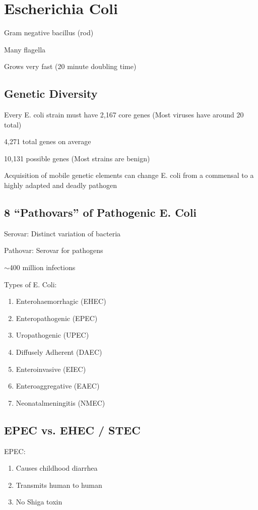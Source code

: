 \documentclass{notes}
\begin{document}
\section*{Escherichia Coli}
Gram negative bacillus (rod)

Many flagella

Grows very fast (20 minute doubling time)

\subsection*{Genetic Diversity}
Every E. coli strain must have 2,167 core genes (Most viruses have around 20 total)

4,271 total genes on average

10,131 possible genes (Most strains are benign)

Acquisition of mobile genetic elements can change E. coli from a commensal to a highly adapted and deadly pathogen

\subsection*{8 ``Pathovars'' of Pathogenic E. Coli}
Serovar: Distinct variation of bacteria

Pathovar: Serovar for pathogens

\(\sim\)400 million infections

Types of E. Coli:
\begin{enumerate}
    \item Enterohaemorrhagic (EHEC)
    \item Enteropathogenic (EPEC)
    \item Uropathogenic (UPEC)
    \item Diffusely Adherent (DAEC)
    \item Enteroinvasive (EIEC)
    \item Enteroaggregative (EAEC)
    \item Neonatalmeningitis (NMEC)
\end{enumerate}

\subsection*{EPEC vs. EHEC / STEC}
EPEC:
\begin{enumerate}
    \item Causes childhood diarrhea
    \item Transmits human to human
    \item No Shiga toxin
\end{enumerate}
\end{document}
